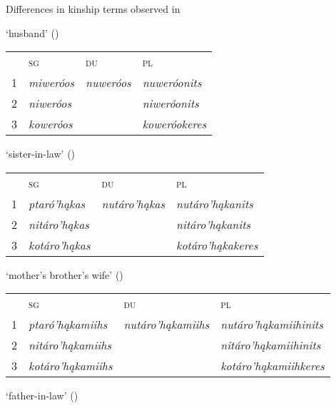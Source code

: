 \begin{exe}

\item\label{DifferentKinship} Differences in kinship terms observed in \citet{hollow1970}

\begin{xlist}

\item\label{DifferentKinship1} `husband' (\Hermaphrodite)

    \begin{tabular}{llll}
    ~ &\textsc{sg}&\textsc{du}&\textsc{pl}\\
    1&  \textit{miweróos}&   \textit{nuweróos}                                         &\textit{nuweróonits}\\
    2&  \textit{niweróos}&    &\textit{niweróonits}\\
    3&  \textit{koweróos}&    &\textit{koweróokeres}
    \end{tabular}
    
\item\label{DifferentKinship2} `sister-in-law' (\Male)

    \begin{tabular}{llll}
    ~ &\textsc{sg}&\textsc{du}&\textsc{pl}\\
    1&  \textit{ptaró'hąkas}&   \textit{nutáro'hąkas}                                         &\textit{nutáro'hąkanits}\\
    2&  \textit{nitáro'hąkas}&    &\textit{nitáro'hąkanits}\\
    3&  \textit{kotáro'hąkas}&    &\textit{kotáro'hąkakeres}
    \end{tabular}

\item\label{DifferentKinship3} `mother’s brother's wife' (\Male)

    \begin{tabular}{llll}
    ~ &\textsc{sg}&\textsc{du}&\textsc{pl}\\
    1&  \textit{ptaró'hąkamiihs}&   \textit{nutáro'hąkamiihs}                                         &\textit{nutáro'hąkamiihinits}\\
    2&  \textit{nitáro'hąkamiihs}&    &\textit{nitáro'hąkamiihinits}\\
    3&  \textit{kotáro'hąkamiihs}&    &\textit{kotáro'hąkamiihkeres}
    \end{tabular}
    
\item\label{DifferentKinship4} `father-in-law' (\Male)


\end{xlist}
\end{exe}
